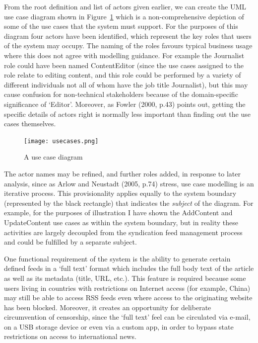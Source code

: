 \documentclass[a4paper]{article}
\begin{document}
From the root definition and list of actors given earlier, we can create the UML use case diagram shown in Figure~\ref{use-cases} which is a non-comprehensive depiction of some of the use cases that the system must support. For the purposes of this diagram four actors have been identified, which represent the key roles that users of the system may occupy. The naming of the roles favours typical business usage where this does not agree with modelling guidance. For example the \textsf{Journalist} role could have been named \textsf{ContentEditor} (since the use cases assigned to the role relate to editing content, and this role could be performed by a variety of different individuals not all of whom have the job title \textsf{Journalist}), but this may cause confusion for non-technical stakeholders because of the domain-specific significance of `Editor'. Moreover, as Fowler (2000, p.43) points out, getting the specific details of actors right is normally less important than finding out the use cases themselves.

\begin{figure}
  \texttt{[image: usecases.png]}
  \caption{A use case diagram}
  \label{use-cases}
\end{figure}

The actor names may be refined, and further roles added, in response to later analysis, since as Arlow and Neustadt (2005, p.74) stress, use case modelling is an iterative process. This provisionality applies equally to the system boundary (represented by the black rectangle) that indicates the \textit{subject} of the diagram. For example, for the purposes of illustration I have shown the \textsf{AddContent} and \textsf{UpdateContent} use cases as within the system boundary, but in reality these activities are largely decoupled from the syndication feed management process and could be fulfilled by a separate subject.

One functional requirement of the system is the ability to generate certain defined feeds in a `full text' format which includes the full body text of the article as well as its metadata (title, URL, etc.). This feature is required because some users living in countries with restrictions on Internet access (for example, China) may still be able to access RSS feeds even where access to the originating website has been blocked. Moreover, it creates an opportunity for deliberate circumvention of censorship, since the `full text' feel can be circulated via e-mail, on a USB storage device or even via a custom app, in order to bypass state restrictions on access to international news.
\end{document}
